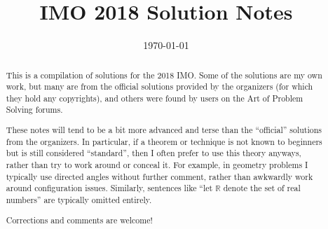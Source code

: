 \documentclass[11pt]{scrartcl}
\title{IMO 2018 Solution Notes}
\date{\today}
\begin{document}
\maketitle

\begin{abstract}
This is a compilation of solutions
for the 2018 IMO.
Some of the solutions are my own work,
but many are from the official solutions provided by the organizers
(for which they hold any copyrights),
and others were found by users on the Art of Problem Solving forums.

These notes will tend to be a bit more advanced and terse than the ``official''
solutions from the organizers.
In particular, if a theorem or technique is not known to beginners
but is still considered ``standard'', then I often prefer to
use this theory anyways, rather than try to work around or conceal it.
For example, in geometry problems I typically use directed angles
without further comment, rather than awkwardly work around configuration issues.
Similarly, sentences like ``let $\mathbb{R}$ denote the set of real numbers''
are typically omitted entirely.

Corrections and comments are welcome!
\end{abstract}

\tableofcontents
\newpage

\addtocounter{section}{-1}
\end{document}
